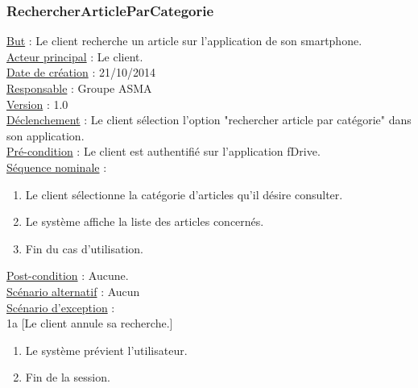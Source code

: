 \subsubsection{RechercherArticleParCategorie}
	\underline{But} : Le client recherche un article sur l'application de son smartphone.\\
	\underline{Acteur principal} : Le client.\\
	\underline{Date de création} : 21/10/2014\\
	\underline{Responsable} : Groupe ASMA\\
	\underline{Version} : 1.0\\
	\underline{Déclenchement} : Le client sélection l'option "rechercher article par catégorie" dans son application.\\
	\underline{Pré-condition} : Le client est authentifié sur l'application fDrive.\\
	\underline{Séquence nominale} :
		\begin{enumerate}
			\item Le client sélectionne la catégorie d'articles qu'il désire consulter.
			\item Le système affiche la liste des articles concernés.
			\item Fin du cas d'utilisation.
		\end{enumerate}
	\underline{Post-condition} : Aucune.\\
	\underline{Scénario alternatif} : Aucun\\
	\underline{Scénario d'exception} :\\
 		1a [Le client annule sa recherche.]
 			\begin{enumerate}[label=1a.\arabic* ]
 				\item Le système prévient l'utilisateur.
 				\item Fin de la session.
 			\end{enumerate}